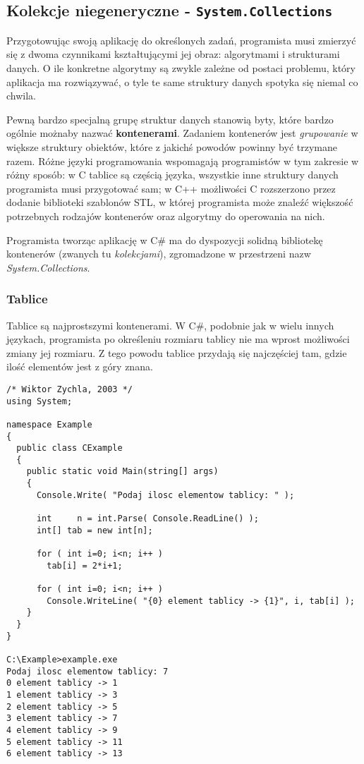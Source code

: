 ﻿\subsection{Kolekcje niegeneryczne - {\tt System.Collections}}

Przygotowując swoją aplikację do określonych zadań, programista musi zmierzyć się z dwoma czynnikami
kształtującymi jej obraz: algorytmami i strukturami danych. O ile konkretne algorytmy są zwykle zależne
od postaci problemu, który aplikacja ma rozwiązywać, o tyle te same struktury danych spotyka się niemal co chwila.

Pewną bardzo specjalną grupę struktur danych stanowią byty, które bardzo ogólnie możnaby nazwać 
{\bf kontenerami}. Zadaniem kontenerów jest {\em grupowanie} w większe struktury obiektów, 
które z jakichś powodów powinny być trzymane razem. Różne języki programowania wspomagają programistów 
w tym zakresie w różny sposób: w C tablice są częścią języka, wszystkie inne struktury danych programista
musi przygotować sam; w C++ możliwości C rozszerzono przez dodanie biblioteki szablonów STL, w której
programista może znaleźć większość potrzebnych rodzajów kontenerów oraz algorytmy do operowania na nich.

Programista tworząc aplikację w C\# ma do dyspozycji solidną bibliotekę kontenerów (zwanych tu {\em kolekcjami}),
zgromadzone w przestrzeni nazw {\em System.Collections}. 

\subsubsection{Tablice}

Tablice są najprostszymi kontenerami. W C\#, podobnie jak w wielu innych językach, 
programista po określeniu rozmiaru tablicy nie ma wprost możliwości zmiany jej rozmiaru. Z tego powodu
tablice przydają się najczęściej tam, gdzie ilość elementów jest z góry znana. 

\begin{scriptsize}
\begin{verbatim}
/* Wiktor Zychla, 2003 */
using System;

namespace Example
{
  public class CExample 
  {
    public static void Main(string[] args)
    {
      Console.Write( "Podaj ilosc elementow tablicy: " );

      int     n = int.Parse( Console.ReadLine() );
      int[] tab = new int[n];

      for ( int i=0; i<n; i++ )
        tab[i] = 2*i+1;

      for ( int i=0; i<n; i++ )
        Console.WriteLine( "{0} element tablicy -> {1}", i, tab[i] );
    }
  }
}

C:\Example>example.exe
Podaj ilosc elementow tablicy: 7
0 element tablicy -> 1
1 element tablicy -> 3
2 element tablicy -> 5
3 element tablicy -> 7
4 element tablicy -> 9
5 element tablicy -> 11
6 element tablicy -> 13
\end{verbatim}
\end{scriptsize}

